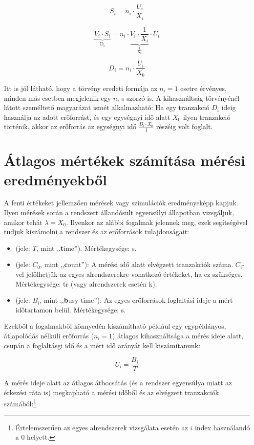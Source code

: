 $$S_i = n_i \cdot \frac{U_i}{X_i}$$

$$\underbrace{V_i \cdot S_i}_\mathrm{D_i} = n_i \cdot \underbrace{V_i \cdot \frac{1}{X_i}}_\mathrm{\frac{1}{X_0}} \cdot U_i$$

$$D_i = n_i \cdot \frac{U_i}{X_0}$$

Itt is jól látható, hogy a törvény eredeti formája az $n_i = 1$ esetre érvényes, minden más esetben megjelenik egy $n_i$-s szorzó is. A kihasználtság törvényénél látott személtető magyarázat ismét alkalmazható: Ha egy tranzakció $D_i$ ideig használja az adott erőforrást, és egy egységnyi idő alatt $X_0$ ilyen tranzakció történik, akkor az erőforrás az egységnyi idő $\frac{D_i \cdot X_0}{1}$ részéig volt foglalt.

\section{Átlagos mértékek számítása mérési eredményekből }

A fenti értékeket jellemzően mérések vagy szimulációk eredményeképp kapjuk. Ilyen mérések során a rendszert állandósult egyensúlyi állapotban vizsgáljuk, amikor tehát $\lambda = X_0$. Ilyenkor az alábbi fogalmak jelennek meg, ezek segítségével tudjuk kiszámolni a rendszer és az erőforrások tulajdonságait:

\begin{definicio}
\begin{itemize}
	\item {} (jele: $T$, mint ,,\textbf{t}ime''). Mértékegysége: s.
	\item {} (jele: $C_0$, mint ,,\textbf{c}ount''): A mérési idő alatt elvégzett tranzakciók száma. $C_i$-vel jelölhetjük az egyes alrendszerekre vonatkozó értékeket, ha ez szükséges. Mértékegysége: tr (vagy alrendszerek esetén k).
	\item {} (jele: $B_i$, mint ,,\textbf{b}usy time''): Az egyes erőforrások foglaltási ideje a mért időtartamon belül. Mértékegysége: s.
\end{itemize}
\end{definicio}

Ezekből a fogalmakből könnyedén kiszámítható például egy egypéldányos, átlapolódás nélküli erőforrás ($n_i = 1$) átlagos kihasználtsága a mérés ideje alatt, csupán a foglaltásgi idő és a mért idő arányát kell kiszámítanunk:

$$U_i = \frac{B_i}{T}$$

A mérés ideje alatt az átlagos átbocsátás (és a rendszer egyensúlya miatt az érkezési ráta is) megkapható a mérési időből és az elvégzett tranzakciók számából:\footnote{Értelemszerűen az egyes alrendszerek vizsgálata esetén az $i$ index használandó a 0 helyett.}

